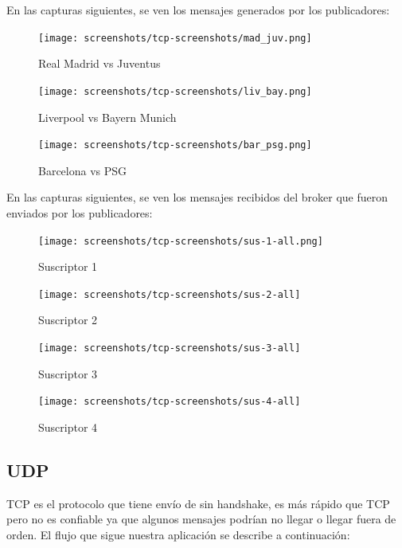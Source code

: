 \documentclass[10pt]{article}
\begin{document}
En las capturas siguientes, se ven los mensajes generados por los publicadores:

\begin{figure}[H]
    \centering
    \texttt{[image: screenshots/tcp-screenshots/mad\_juv.png]}
    \caption{Real Madrid vs Juventus}
\end{figure} 

\begin{figure}[H]
    \centering
    \texttt{[image: screenshots/tcp-screenshots/liv\_bay.png]}
    \caption{Liverpool vs Bayern Munich}
\end{figure} 

\begin{figure}[H]
    \centering
    \texttt{[image: screenshots/tcp-screenshots/bar\_psg.png]}
    \caption{Barcelona vs PSG}
\end{figure} 

En las capturas siguientes, se ven los mensajes recibidos del broker que fueron enviados por los publicadores:


\begin{figure}[H]
    \centering
    \texttt{[image: screenshots/tcp-screenshots/sus-1-all.png]}
    \caption{Suscriptor 1}
\end{figure} 



\begin{figure}[H]
    \centering
    \texttt{[image: screenshots/tcp-screenshots/sus-2-all]}
   \caption{Suscriptor 2}
\end{figure} 



\begin{figure}[H]
    \centering
    \texttt{[image: screenshots/tcp-screenshots/sus-3-all]}
    \caption{Suscriptor 3}
\end{figure} 



\begin{figure}[H]
    \centering
    \texttt{[image: screenshots/tcp-screenshots/sus-4-all]}
    \caption{Suscriptor 4}
\end{figure} 

\subsection{UDP}
TCP es el protocolo que tiene envío de sin handshake, es más rápido que TCP pero no es confiable ya que algunos mensajes podrían no llegar o llegar fuera de orden. El flujo que sigue nuestra aplicación se describe a continuación:
\end{document}
